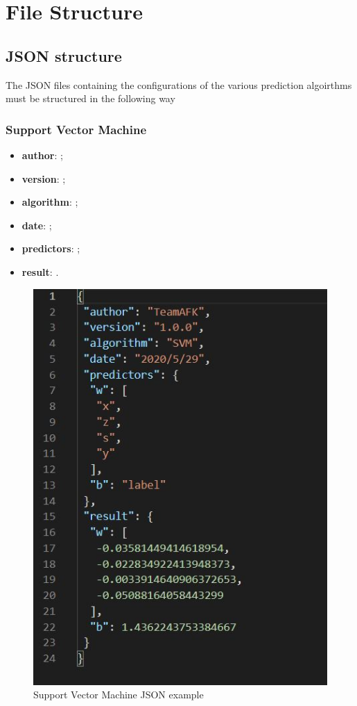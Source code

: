\section{File Structure}
\subsection{JSON structure}
The JSON files containing the configurations of the various prediction algoirthms must be structured in the following way

\subsubsection{Support Vector Machine}
\begin{itemize}
	\item \textbf{author}: ;
	\item \textbf{version}: ;
	\item \textbf{algorithm}: ;
	\item \textbf{date}: ;
	\item \textbf{predictors}: ;
	\item \textbf{result}: .
\end{itemize}
\begin{figure}[H]
\centering
\includegraphics[scale=0.65]{img/json/jsonSVM.jpg}
\caption{Support Vector Machine JSON example}
\end{figure}
\newpage

